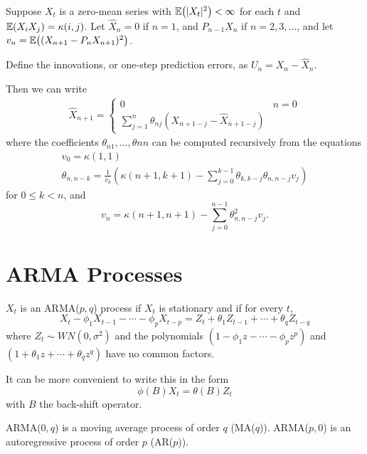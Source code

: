 \begin{thm}
  \label{defn:stationary_processes:2}
  Suppose $X_{t}$ is a zero-mean series with $\E{|X_{t}|^{2}} <
  \infty$ for each $t$ and $\E{X_{i} X_{j}} = \kappa(i, j)$.
  Let $\hat X_{n} = 0$ if $n = 1$, and $P_{n-1} X_{n}$ if $n = 2, 3,
  \dots$, and let $v_{n} = \E{(X_{n+1} - P_{n} X_{n+1})^{2}}$.

  Define the innovations, or one-step prediction errors, as $U_{n} =
  X_{n} - \hat X_{n}$.

  Then we can write
  \begin{align}
    \label{eq:16}
    \hat X_{n+1} =
    \begin{cases}
      0 & n = 0 \\
      \sum_{j=1}^{n} \theta_{nj}(X_{n+1-j} - \hat X_{n+1 - j})
    \end{cases}
  \end{align}
  where the coefficients $\theta_{n1}, \dots, \theta{nn}$ can be
  computed recursively from the equations
  \begin{align}
    \label{eq:17}
    v_{0} = \kappa(1, 1) \\
    \theta_{n, n-k} = \frac{1}{v_{k}}(\kappa(n+1, k+1) -
    \sum_{j=0}^{k-1} \theta_{k, k-j} \theta_{n, n-j} v_{j})
  \end{align}  for $0 \leq k < n$, and
  \begin{equation}
    \label{eq:18}
    v_{n} = \kappa(n+1, n+1) - \sum_{j=0}^{n-1} \theta^{2}_{n, n-j} v_{j}.
  \end{equation}
\end{thm}

\section{ARMA Processes}
\label{sec:arma-processes}

\begin{defn}
  \label{defn:arma_processes:1}
  $X_{t}$ is an ARMA($p, q$) process if $X_{t}$ is stationary and if
  for every $t$,
  \begin{equation}
    \label{eq:14}
    X_{t} - \phi_{1} X_{t-1} - \cdots - \phi_{p} X_{t-p} = Z_{t} +
    \theta_{1} Z_{t-1} + \cdots + \theta_{q} Z_{t-q}
  \end{equation} where $Z_{t} \sim WN(0, \sigma^{2})$  and the
  polynomials $(1 - \phi_{1}z - \cdots - \phi_{p} z^{p})$ and $(1 +
  \theta_{1} z + \cdots + \theta_{q} z^{q})$ have no common factors.

  It can be more convenient to write this in the form
  \begin{equation}
    \label{eq:19}
    \phi(B) X_{t} = \theta(B) Z_{t}
  \end{equation}
  with $B$ the back-shift operator.

  ARMA($0, q$) is a moving average process of order $q$ (MA($q$)).
  ARMA($p, 0$) is an autoregressive process of order $p$ (AR($p$)).
\end{defn}

